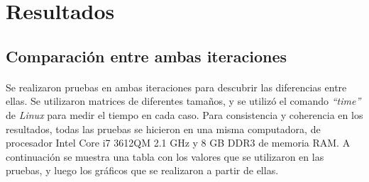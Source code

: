 \documentclass[a4paper,11pt]{article}
\begin{document}
\newpage
\section{Resultados}
\subsection{Comparaci\'on entre ambas iteraciones}
\paragraph{}
Se realizaron pruebas en ambas iteraciones para descubrir las diferencias entre
ellas. Se utilizaron matrices de diferentes tamaños, y se utiliz\'o el comando
\emph{``time''} de \emph{Linux} para medir el tiempo en cada caso. Para
consistencia y coherencia en los resultados, todas las pruebas se hicieron en
una misma computadora, de procesador Intel Core i7 3612QM 2.1 GHz y 8 GB DDR3
de memoria RAM\@. A continuaci\'on se muestra una tabla con los valores que se
utilizaron en las pruebas, y luego los gr\'aficos que se realizaron a partir de
ellas.\\[10pt]
\end{document}
